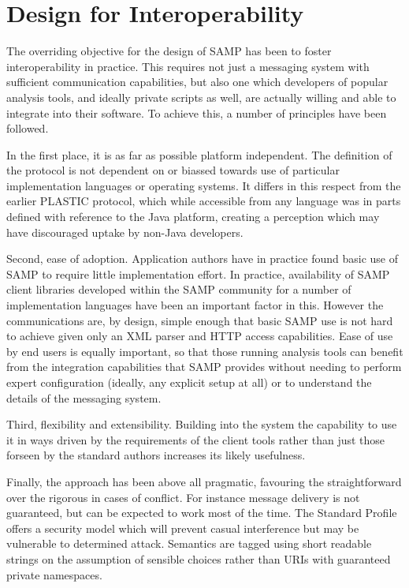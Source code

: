 \documentclass[5p]{elsarticle}
\begin{document}
\section{Design for Interoperability} \label{sec:design}

The overriding objective for the design of SAMP
has been to foster interoperability in practice.
This requires not just a messaging system with sufficient communication
capabilities, but also one which developers of popular analysis tools,
and ideally private scripts as well,
are actually willing and able to integrate into their software.
To achieve this, a number of principles
have been followed.

In the first place, it is as far as possible platform independent.
The definition of the protocol is not dependent on or biassed
towards use of particular implementation languages or operating systems.
It differs in this respect from the earlier PLASTIC protocol,
which while accessible from any language was in parts defined with
reference to the Java platform, creating a perception which may
have discouraged uptake by non-Java developers.

Second, ease of adoption.
Application authors have in practice found basic use of 
SAMP to require little implementation effort.
In practice, availability of SAMP client libraries
developed within the SAMP community
for a number of implementation languages have been an important
factor in this.
However the communications are, by design, simple enough that
basic SAMP use is not hard to achieve given only an XML parser
and HTTP access capabilities.
Ease of use by end users is equally important,
so that those running analysis tools
can benefit from the integration capabilities that SAMP provides
without needing to perform expert configuration
(ideally, any explicit setup at all) or to understand the details
of the messaging system.

Third, flexibility and extensibility.
Building into the system the capability to use it in ways
driven by the requirements of the client tools rather than
just those forseen by the standard authors increases its likely usefulness.

Finally, the approach has been above all pragmatic, favouring
the straightforward over the rigorous in cases of conflict.
For instance message delivery is not guaranteed, but can be 
expected to work most of the time.  The Standard Profile offers
a security model which will prevent casual interference
but may be vulnerable to determined attack.  Semantics are tagged
using short readable strings on the assumption of sensible choices
rather than URIs with guaranteed private namespaces.
\end{document}
